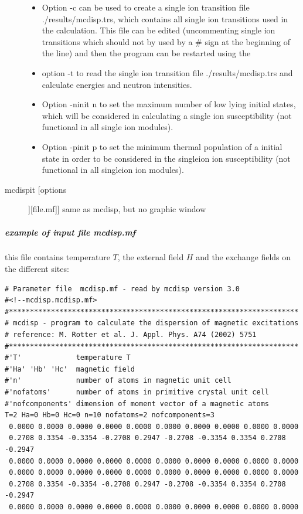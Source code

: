 \begin{description}
\begin{itemize}
				\item Option {\prg -c}  can be used to create  a single ion
				transition file {\prg ./results/mcdisp.trs}, which contains
				all single ion transitions used in the calculation. This file can
				be edited (uncommenting single ion transitions which should not
				by used by a \# sign at the beginning of the line)
				and then the program can be restarted using the 
				\item  option {\prg -t} to
				read the single ion transition file {\prg ./results/mcdisp.trs} and
				calculate energies and neutron intensities.
				\item Option {\prg -ninit n} to set the maximum number of low lying
                                 initial states, which will be considered in calculating a single ion susceptibility (not functional
                                 in all single ion modules).
                                 \item Option {\prg -pinit p} to set the minimum thermal population of a 
                                 initial state in order to be considered in the singleion ion susceptibility (not functional in
                                 all singleion ion modules).
				\end{itemize}
\item [\prg mcdispit [options]][file.mf]]  same as {\prg mcdisp}, but no graphic window
\end{description} 

\subparagraph{example of input file {\prg  mcdisp.mf}}
this file contains temperature $T$, the external field $H$ and
the exchange fields on the different sites:

\begin{verbatim}
# Parameter file  mcdisp.mf - read by mcdisp version 3.0
#<!--mcdisp.mcdisp.mf>
#*********************************************************************
# mcdisp - program to calculate the dispersion of magnetic excitations
# reference: M. Rotter et al. J. Appl. Phys. A74 (2002) 5751
#*********************************************************************
#'T'             temperature T
#'Ha' 'Hb' 'Hc'  magnetic field
#'n'             number of atoms in magnetic unit cell
#'nofatoms'      number of atoms in primitive crystal unit cell
#'nofcomponents' dimension of moment vector of a magnetic atoms
T=2 Ha=0 Hb=0 Hc=0 n=10 nofatoms=2 nofcomponents=3
 0.0000 0.0000 0.0000 0.0000 0.0000 0.0000 0.0000 0.0000 0.0000 0.0000
 0.2708 0.3354 -0.3354 -0.2708 0.2947 -0.2708 -0.3354 0.3354 0.2708 -0.2947
 0.0000 0.0000 0.0000 0.0000 0.0000 0.0000 0.0000 0.0000 0.0000 0.0000
 0.0000 0.0000 0.0000 0.0000 0.0000 0.0000 0.0000 0.0000 0.0000 0.0000
 0.2708 0.3354 -0.3354 -0.2708 0.2947 -0.2708 -0.3354 0.3354 0.2708 -0.2947
 0.0000 0.0000 0.0000 0.0000 0.0000 0.0000 0.0000 0.0000 0.0000 0.0000
\end{verbatim}

